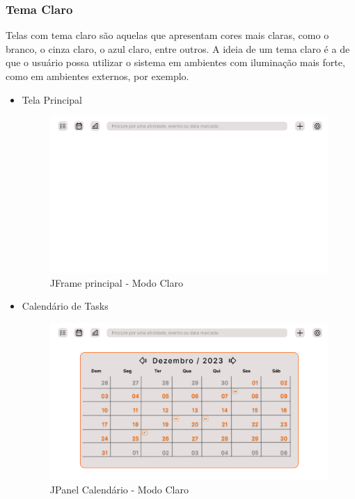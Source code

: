 \documentclass[a4paper,12pt]{article}
\begin{document}
\subsubsection{Tema Claro}
Telas com tema claro são aquelas que apresentam cores mais claras, como o branco, o cinza claro, o azul claro, entre outros. 
A ideia de um tema claro é a de que o usuário possa utilizar o sistema em ambientes com iluminação mais forte, como em ambientes 
externos, por exemplo.
\begin{itemize}
	\item Tela Principal
	\begin{figure}[H]
		\centering
		\includegraphics[scale=0.20]{prototypes/white/Main Window.png}
		\caption{JFrame principal - Modo Claro}
	\end{figure}

	\item Calendário de Tasks
	\begin{figure}[H]
		\centering
		\includegraphics[scale=0.20]{prototypes/white/Calendar Panel Window.png}
		\caption{JPanel Calendário - Modo Claro}
	\end{figure}	


\end{itemize}
\end{document}
